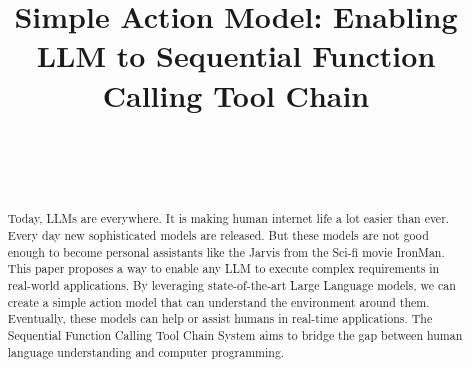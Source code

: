 \documentclass[conference]{IEEEtran}
\begin{document}
\title{Simple Action Model: Enabling LLM to Sequential Function Calling Tool Chain\\
}

\author{

{}

\\


\and


\\


\and






}

\maketitle

\begin{abstract}
    Today, LLMs are everywhere. It is making human internet life a lot easier than ever. Every day new sophisticated models are released. But these models are not good enough to become personal assistants like the Jarvis from the Sci-fi movie IronMan. This paper proposes a way to enable any LLM to execute complex requirements in real-world applications. By leveraging state-of-the-art Large Language models, we can create a simple action model that can understand the environment around them. Eventually, these models can help or assist humans in real-time applications. The Sequential Function Calling Tool Chain System aims to bridge the gap between human language understanding and computer programming.
\end{abstract}
\end{document}

